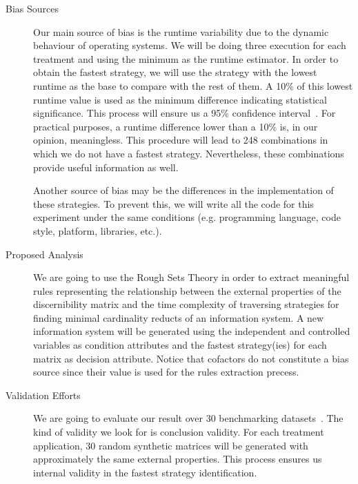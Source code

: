 \documentclass[11pt]{article}   %
\begin{document}
  \begin{description}
    \item[Bias Sources] Our main source of bias is the runtime variability due to the dynamic behaviour of
    					   	operating systems. We will be doing three execution for each treatment and using 
    					   	the minimum as the runtime estimator. In order to obtain the fastest strategy, we 
    					   	will use the strategy with the lowest runtime as the base to compare with the rest of 
    					   	them. A 10\% of this lowest runtime value is used as the minimum difference indicating
    					   	statistical significance. This process will ensure us a 95\% confidence
    					   	interval~\cite{Haveraaen01}.
    					   	For practical purposes, a runtime difference lower than a 10\% is, in our opinion, 
    					   	meaningless. This procedure will lead to 248 combinations in which we do not have a
    					   	fastest strategy. Nevertheless, these combinations provide useful information as well.
    					   	
    					   	Another source of bias may be the differences in the implementation of these strategies.
    					   	To prevent this, we will write all the code for this experiment under the same conditions
    					   	(e.g. programming language, code style, platform, libraries, etc.).  					   	
    	\item[Proposed Analysis] We are going to use the Rough Sets Theory in order to extract meaningful rules 
    							 representing the relationship between the external properties of the discernibility 
  							 matrix and the time complexity of traversing strategies for finding minimal
  							 cardinality reducts of an information system. A new information system will be
  							 generated using the independent and controlled variables as condition attributes and
  							 the fastest strategy(ies) for each matrix as decision attribute. 
  							 Notice that cofactors do not constitute a bias source since their value
  							 is used for the rules extraction precess.
    	\item[Validation Efforts] We are going to evaluate our result over 30 benchmarking datasets~\cite{Bache13}.
    							 The kind of validity we look for is conclusion validity. 
    							 For each treatment application, 30 random synthetic matrices will be generated with
    							 approximately the same external properties. This process ensures us internal validity
    							 in the fastest strategy identification.
  \end{description}
\end{document}
